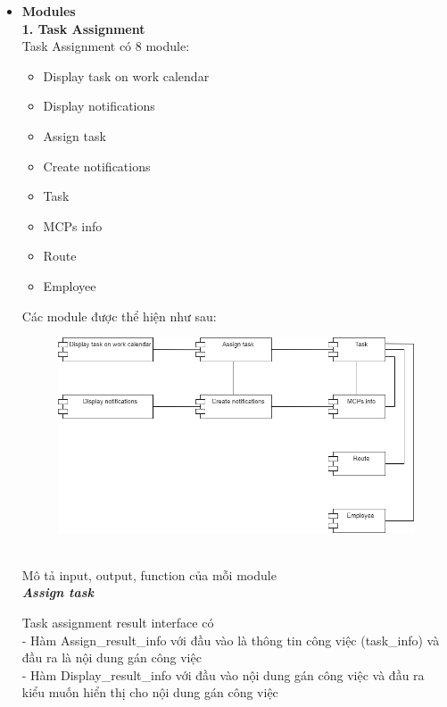 \documentclass[a4paper]{article}
\begin{document}
\begin{itemize}
    
    \item \textbf{Modules} \\
\textbf{    1. Task Assignment } \\
    Task Assignment có 8 module:
    \begin{itemize}
        \item Display task on work calendar
        \item Display notifications
        \item Assign task
        \item Create notifications
        \item Task
        \item MCPs info
        \item Route
        \item Employee 
    \end{itemize}
    Các module được thể hiện như sau:\\
    \begin{figure}[!h]
    \begin{center}
      \includegraphics[width=6in]{Image/task_ass_module.png}
    \end{center}
\end{figure} \\
    Mô tả input, output, function của mỗi module\\
\textbf{    \textit{Assign task} }
    
\begin{minipage}[b]{0.4\textwidth}
Task assignment result interface có\\
- Hàm Assign\_result\_info với đầu vào là thông tin công việc (task\_info) và đầu ra là nội dung gán công việc\\
- Hàm Display\_result\_info với đầu vào nội dung gán công việc và đầu ra kiểu muốn hiển thị cho nội dung gán công việc
\end{minipage}
\hfill
{}


\end{itemize}
\end{document}
